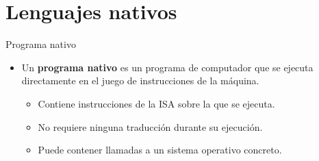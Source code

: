 \section{Lenguajes nativos}

\begin{frame}[t]{Programa nativo}
  \begin{itemize}
    \item Un \textbf{programa nativo} es un programa de computador que se ejecuta directamente en el juego de instrucciones de la máquina.
      \begin{itemize}
        \item Contiene instrucciones de la ISA sobre la que se ejecuta.
        \item No requiere ninguna traducción durante su ejecución.
        \item Puede contener llamadas a un sistema operativo concreto.
      \end{itemize}
  \end{itemize}
\end{frame}

